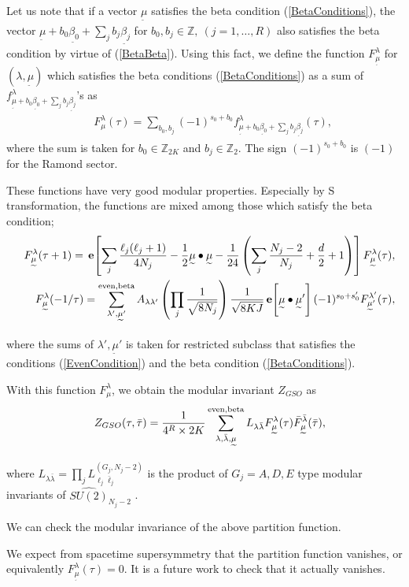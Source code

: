 \documentclass[a4paper,12pt]{article}
\numberwithin{equation}{section}
\newcommand{\Zb}{{\mathbb Z}}
\newcommand{\e}[1]{\,{\bf e}\!\left[#1\right]}
\newcommand{\mt}{\underset{\widetilde{}}{\mu}}
\newcommand{\bt}[1]{\underset{\widetilde{}}{\beta_{#1}}}
\newcommand{\taub}{\bar{\tau}}
\newcommand{\lambdab}{\bar{\lambda}}
\begin{document}
Let us note that if a vector $\mt$ satisfies the beta condition
(\ref{BetaConditions}), the vector $\mt+b_0\bt{0}+\sum_jb_j\bt{j}$
for $b_0,b_j\in\Zb,\ (j=1,\dots,R)$
 also satisfies the beta condition by virtue of (\ref{BetaBeta}).
Using this fact, we define the function $F_{\mt}^{\lambda}$
for $(\lambda,\mt)$ which satisfies the beta conditions 
(\ref{BetaConditions}) as a sum of
 $f_{\mt+b_0\bt{0}+\sum_jb_j\bt{j}}^{\lambda}$'s as
\begin{eqnarray*}
 && F_{\mu}^{\lambda}(\tau)=\sum_{b_0,b_j}(-1)^{s_0+b_0}
f_{\mt+b_0\bt{0}+\sum_jb_j\bt{j}}^{\lambda}(\tau),
\end{eqnarray*}
where the sum is taken for $b_0\in \Zb_{2K}$ and $b_j\in \Zb_2$.
The sign $(-1)^{s_0+b_0}$ is $(-1)$ for the Ramond sector.
 
These functions have very good modular properties. Especially
by S transformation, the functions are mixed among those which
satisfy the beta condition;
\begin{eqnarray*}
 && F_{\mt}^{\lambda}(\tau+1)=
\e{\sum_j\frac{\ell_j(\ell_j+1)}{4N_j}
-\frac12 \mt\bullet\mt-\frac1{24}\left(\sum_{j}\frac{N_j-2}{N_j}+\frac d2+1\right)}F_{\mt}^{\lambda}(\tau),\\
 && F_{\mt}^{\lambda}(-1/\tau)=\sum_{\lambda',\mt'}^{\rm even,beta}
A_{\lambda\lambda'}\left(\prod_j\frac{1}{\sqrt{8N_j}}\right)
\frac{1}{\sqrt{8KJ}}\e{\mt\bullet\mt'}(-1)^{s_0+s_0'}
F_{\mt'}^{\lambda'}(\tau),
\end{eqnarray*}
where the sums of $\lambda',\mt'$ is taken for 
restricted subclass that satisfies
the conditions (\ref{EvenCondition}) 
and the beta condition (\ref{BetaConditions}).

With this function $F_{\mu}^{\lambda}$, 
we obtain the modular invariant $Z_{GSO}$
as
\begin{eqnarray*}
 &&Z_{GSO}(\tau,\taub) = \frac{1}{4^R\times 2K}\sum_{\lambda,\lambdab,\mt}^{\rm even,beta}
L_{\lambda\lambdab}F_{\mt}^{\lambda}(\tau)\bar F_{\mt}^{\lambdab}(\taub),\\
\end{eqnarray*}
where $L_{\lambda\lambdab}=\prod_jL_{\ell_j\bar\ell_j}^{(G_j,N_j-2)}$ is 
the product of $G_j=A,D,E$ type modular invariants
of $\widehat{SU(2)}_{N_j-2}$ \cite{CIZ87,CIZ87CMP,Kat87}.

We can check the modular invariance of the above partition function.

We expect from spacetime supersymmetry that the partition function
vanishes, or equivalently $F_{\mt}^{\lambda}(\tau)=0$. It is a
future work to check that it actually vanishes.
\end{document}
